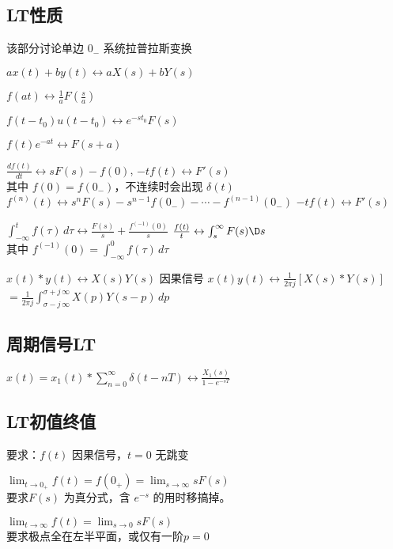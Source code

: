 \subsection{LT性质}
该部分讨论单边 $0_-$ 系统拉普拉斯变换
\begin{description}
\tightlist

\item[线性]
$ax(t)+by(t)\leftrightarrow aX(s)+bY(s)$

\item[比例变换]
$\displaystyle f(at) \leftrightarrow  \frac{1}{a}F\left(\frac{s}{a}\right)$

\item[时移]
$f(t-t_0)u(t-t_0) \leftrightarrow  e^{-st_0}F(s)$

\item[频移]
$f(t)e^{-at} \leftrightarrow  F(s+a)$

\item[微分]
$\displaystyle \frac{df(t)}{dt} \leftrightarrow  sF(s) - f(0)$, $-tf(t)\leftrightarrow F'(s)$\\
其中 $f(0) = f(0_-)$，不连续时会出现 $\delta(t)$
\(f^{(n)}(t) \leftrightarrow s^nF(s)-s^{n-1}f(0_-)-\cdots - f^{(n-1)}(0_-)\)
\(-tf(t) \leftrightarrow F'(s)\)

\item[积分]
$\displaystyle\int_{-\infty}^t f(\tau)\,d\tau \leftrightarrow  \frac{F(s)}{s} + \frac{f^{(-1)}(0)}{s}$ $\frac{f(t)}{t}\leftrightarrow \int_s^\infty F(s)\D s$\\
其中 $f^{(-1)}(0) = \int_{-\infty}^0 f(\tau)\,d\tau$

\item[卷积] $x(t)*y(t) \leftrightarrow  X(s)Y(s)$ 因果信号 
$x(t)y(t) \leftrightarrow  \frac{1}{2\pi j}[X(s)*Y(s)]$
$= \frac{1}{2\pi j} \int_{\sigma-j\,\infty}^{\sigma+j\,\infty} X(p)Y(s-p)\,dp$


\end{description}

\subsection{周期信号LT}
\(\displaystyle x(t)=x_1(t)*\sum_{n=0}^{\infty}\delta(t-nT) \leftrightarrow \frac{X_1(s)}{1-e^{-sT}}\)

\subsection{LT初值终值}
要求：\(f(t)\) 因果信号，\(t=0\) 无跳变
\begin{description}
    \tightlist
    \item[初值] \(\displaystyle\lim_{t\to 0_+}f(t) = f(0_+) = \lim_{s\to\infty} sF(s)\) \\
    要求\(F(s)\) 为真分式，含 \(e^{-s}\) 的用时移搞掉。
    \item[终值] \(\displaystyle\lim_{t\to\infty}f(t) = \lim_{s\to 0} sF(s)\) \\
    要求极点全在左半平面，或仅有一阶\(p=0\)
\end{description}

